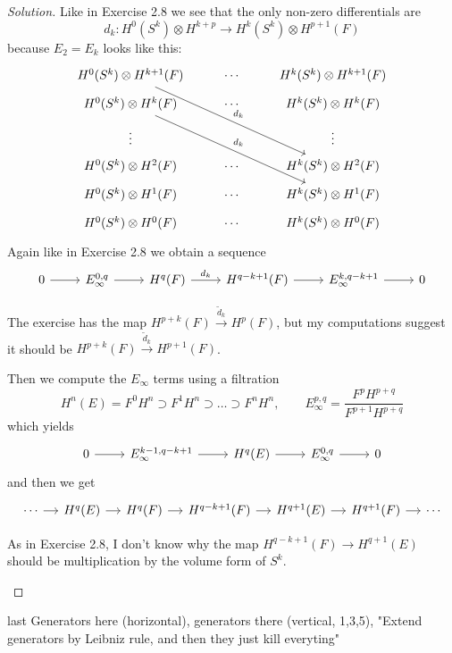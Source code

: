 \begin{proof}[Solution]\leavevmode
\iffalse The argument to construct the Wang exact sequence
\[\begin{tikzcd}[column sep=small]
	\cdots\arrow[r]&H_{q}(F)\arrow[r]&H_{q}(E)\arrow[r]&H_{q-n}(F)\arrow[r]&H_{q-1}(F)\arrow[r]&H_{q-1}(E)\arrow[r]&H_{q-n-1}(F)\arrow[r]&\cdots
\end{tikzcd}\]
is analogous to exercise 2.8.\fi
Like in Exercise 2.8 we see that the only non-zero differentials are
\[d_k:H^{0}(S^k)\otimes H^{k+p}\longrightarrow H^{k}(S^k)\otimes H^{p+1}(F)\]
because $E_{2}=E_k$ looks like this:
\[\begin{tikzcd}[row sep=tiny]
H^{0}(S^k)\otimes H^{k+1}(F)\arrow[rrddd,"d_k"]&\cdots & H^k(S^k)\otimes H^{k+1}(F)\\
	H^{0}(S^k)\otimes H^{k}(F)  \arrow[rrddd,"d_{k}"]&\cdots &H^{k}(S^k)\otimes H^{k}(F)\\
	\vdots &&\vdots \\
	H^{0}(S^k)\otimes H^{2}(F)&\cdots &H^{k}(S^k)\otimes H^{2}(F)\\
	H^{0}(S^k)\otimes H^{1}(F)&\cdots&H^k(S^k)\otimes H^{1}(F)\\
	H^{0}(S^k)\otimes H^{0}(F)&\cdots&H^{k}(S^k)\otimes H^{0}(F) 
\end{tikzcd}\]
Again like in Exercise 2.8 we obtain a sequence
\[\begin{tikzcd}
	0\arrow[r]&E_{\infty}^{0,q}\arrow[r]& H^{q}(F)\arrow[r,"d_k"]&H^{q-k+1}(F)\arrow[r]& E^{k,q-k+1}_{\infty}\arrow[r]&0
\end{tikzcd}\]
\begin{remark}
	The exercise has the map $H^{p+k}(F)\overset{\tilde{d}_{k}}{\longrightarrow} H^{p}(F)$, but my computations suggest it should be $H^{p+k}(F)\overset{\tilde{d}_k}{\longrightarrow}H^{p+1}(F)$.
\end{remark}
Then we compute the $E_{\infty}$ terms using a filtration
\[H^{n}(E)=F^0H^n\supset F^1H^n\supset  \ldots \supset F^nH^n,\qquad E_\infty^{p,q}=\frac{F^pH^{p+q}}{F^{p+1}H^{p+q}}\]
which yields
\[\begin{tikzcd}
	0\arrow[r]&E^{k-1,q-k+1}_{\infty}\arrow[r]&H^{q}(E)\arrow[r]&E^{0,q}_{\infty}\arrow[r]&0
\end{tikzcd}\]
and then we get
\[\begin{tikzcd}[column sep=small]
	\cdots\arrow[r]&H^{q}(E)\arrow[r]&H^{q}(F)\arrow[r]&H^{q-k+1}(F)\arrow[r]&H^{q+1}(E)\arrow[r]&H^{q+1}(F)\arrow[r]&\cdots
\end{tikzcd}\]
\begin{remark}
	As in Exercise 2.8, I don't know why the map $H^{q-k+1}(F)\to H^{q+1}(E)$ should be multiplication by the volume form of $S^k$.
\end{remark}


\end{proof}

\begin{manualexercise}{last}
	Generators here (horizontal), generators there (vertical, 1,3,5), "Extend generators by Leibniz rule, and then they just kill everyting"
\end{manualexercise}


